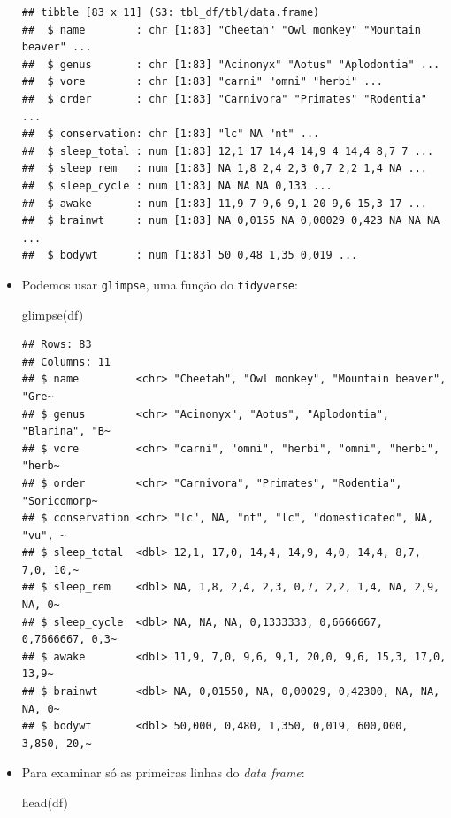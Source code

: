 \documentclass[
  11pt]{report}
\newenvironment{Shaded}{\begin{snugshade}}{\end{snugshade}}
\newcommand{\FunctionTok}[1]{\textcolor[rgb]{0.00,0.00,0.00}{#1}}
\newcommand{\NormalTok}[1]{#1}
\renewenvironment{Shaded}{
    \begin{mdframed}[%
      roundcorner=2pt,%
      innerleftmargin=5pt,%
      innerrightmargin=5pt,%
      topline=true,%
      leftline=true,%
      rightline=true,%
      bottomline=true,%
      linewidth=0.5pt,%
      linecolor=black!20,%
      backgroundcolor=black!2,%
      skipabove=2ex,%
      skipbelow=2.5ex%
    ]%
  }
  {
    \end{mdframed}
  }
\begin{document}
\begin{itemize}
\begin{verbatim}
## tibble [83 x 11] (S3: tbl_df/tbl/data.frame)
##  $ name        : chr [1:83] "Cheetah" "Owl monkey" "Mountain beaver" ...
##  $ genus       : chr [1:83] "Acinonyx" "Aotus" "Aplodontia" ...
##  $ vore        : chr [1:83] "carni" "omni" "herbi" ...
##  $ order       : chr [1:83] "Carnivora" "Primates" "Rodentia" ...
##  $ conservation: chr [1:83] "lc" NA "nt" ...
##  $ sleep_total : num [1:83] 12,1 17 14,4 14,9 4 14,4 8,7 7 ...
##  $ sleep_rem   : num [1:83] NA 1,8 2,4 2,3 0,7 2,2 1,4 NA ...
##  $ sleep_cycle : num [1:83] NA NA NA 0,133 ...
##  $ awake       : num [1:83] 11,9 7 9,6 9,1 20 9,6 15,3 17 ...
##  $ brainwt     : num [1:83] NA 0,0155 NA 0,00029 0,423 NA NA NA ...
##  $ bodywt      : num [1:83] 50 0,48 1,35 0,019 ...
\end{verbatim}
\item
  Podemos usar \texttt{glimpse}, uma função do \texttt{tidyverse}:

\begin{Shaded}
\begin{Highlighting}[]
\FunctionTok{glimpse}\NormalTok{(df)}
\end{Highlighting}
\end{Shaded}

\begin{verbatim}
## Rows: 83
## Columns: 11
## $ name         <chr> "Cheetah", "Owl monkey", "Mountain beaver", "Gre~
## $ genus        <chr> "Acinonyx", "Aotus", "Aplodontia", "Blarina", "B~
## $ vore         <chr> "carni", "omni", "herbi", "omni", "herbi", "herb~
## $ order        <chr> "Carnivora", "Primates", "Rodentia", "Soricomorp~
## $ conservation <chr> "lc", NA, "nt", "lc", "domesticated", NA, "vu", ~
## $ sleep_total  <dbl> 12,1, 17,0, 14,4, 14,9, 4,0, 14,4, 8,7, 7,0, 10,~
## $ sleep_rem    <dbl> NA, 1,8, 2,4, 2,3, 0,7, 2,2, 1,4, NA, 2,9, NA, 0~
## $ sleep_cycle  <dbl> NA, NA, NA, 0,1333333, 0,6666667, 0,7666667, 0,3~
## $ awake        <dbl> 11,9, 7,0, 9,6, 9,1, 20,0, 9,6, 15,3, 17,0, 13,9~
## $ brainwt      <dbl> NA, 0,01550, NA, 0,00029, 0,42300, NA, NA, NA, 0~
## $ bodywt       <dbl> 50,000, 0,480, 1,350, 0,019, 600,000, 3,850, 20,~
\end{verbatim}
\item
  Para examinar só as primeiras linhas do \emph{data frame}:

\begin{Shaded}
\begin{Highlighting}[]
\FunctionTok{head}\NormalTok{(df)}
\end{Highlighting}
\end{Shaded}


\end{itemize}
\end{document}
